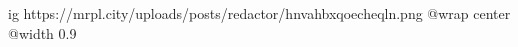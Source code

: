  
 
 
 
 

\ifcmt
  ig https://mrpl.city/uploads/posts/redactor/hnvahbxqoecheqln.png
  @wrap center
  @width 0.9
\fi
